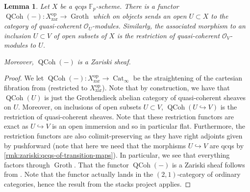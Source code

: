 \documentclass{article}
\theoremstyle{definition}
\theoremstyle{definition}
\theoremstyle{definition}
\theoremstyle{plain}
\newtheorem{lem}[defn]{Lemma}
\theoremstyle{plain}
\theoremstyle{plain}
\theoremstyle{plain}
\theoremstyle{plain}
\theoremstyle{plain}
\theoremstyle{plain}
\theoremstyle{plain}
\theoremstyle{remark}
\theoremstyle{remark}
\theoremstyle{plain}
\theoremstyle{plain}
\theoremstyle{plain}
\theoremstyle{plain}
\theoremstyle{plain}
\newcommand{\Fp}{\mathbb{F}_p}
\newcommand{\op}[1]{#1^{\operatorname{op}}}
\newcommand{\QCoh}[1]{\operatorname{QCoh}(#1)}
\newcommand{\CatInf}{\operatorname{Cat}_{\infty}}
\newcommand{\Groth}{\operatorname{Groth}}
\newcommand{\zar}{\operatorname{zar}}
\begin{document}
\begin{lem} \label{lem:zariski:qcoh}
    Let $X$ be a qcqs $\Fp$-scheme.
    There is a functor $\QCoh{-} \colon \op{X}_{\zar} \to \Groth$
    which on objects sends an open $U \subset X$ to the category 
    of quasi-coherent $\mathcal{O}_U$-modules.
    Similarly, the associated morphism to an inclusion $U \subset V$ of open subsets of $X$
    is the restriction of quasi-coherent $\mathcal{O}_V$-modules to $U$.

    Moreover, $\QCoh{-}$ is a Zariski sheaf.
\end{lem}
\begin{proof}
    We let $\QCoh{-} \colon \op{X}_{\zar} \to \CatInf$ be the straightening of the 
    cartesian fibration from \cite[\href{https://stacks.math.columbia.edu/tag/03YL}{Tag 03YL}]{stacks-project} (restricted to $\op{X}_{\zar}$).
    Note that by construction, we have that $\QCoh{U}$ is just the Grothendieck abelian category of 
    quasi-coherent sheaves on $U$.
    Moreover, on inclusions of open subsets $U \subset V$, $\QCoh{U \hookrightarrow V}$ is the restriction of quasi-coherent sheaves.
    Note that these restriction functors are exact as $U \hookrightarrow V$
    is an open immersion and so in particular flat.
    Furthermore, the restriction functors are also colimit-preserving as they have right adjoints
    given by pushforward (note that here we need that the morphisms $U \hookrightarrow V$ are qcqs by \cref{rmk:zariski:qcqs-of-transition-maps}).
    In particular, we see that everything factors through $\Groth$.
    That the functor $\QCoh{-}$ is a Zariski sheaf follows from \cite[\href{https://stacks.math.columbia.edu/tag/03YM}{Tag 03YM}]{stacks-project}.
    Note that the functor actually lands in the $(2,1)$-category of ordinary categories,
    hence the result from the stacks project applies.
\end{proof}
\end{document}
